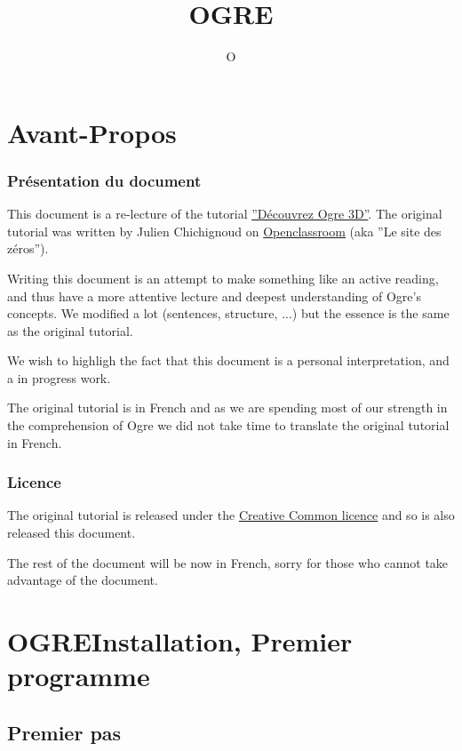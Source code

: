 \documentclass[10pt,a4paper]{report}
\title{OGRE}
\author{O}
\begin{document}
\part*{Avant-Propos}
\section*{Pr\'esentation du document}
This document is a re-lecture of the tutorial \href{http://fr.openclassrooms.com/informatique/cours/decouvrez-ogre-3d}{''D\'ecouvrez Ogre 3D''}. The original tutorial was written by Julien Chichignoud on \href{fr.openclassrooms.com}{Openclassroom} (aka ''Le site des z\'eros'').\newline

Writing this document is an attempt to make something like an active reading, and thus have a more attentive lecture and deepest understanding of Ogre's concepts. We modified a lot (sentences, structure, ...) but the essence is the same as the original tutorial.\newline

We wish to highligh the fact that this document is a personal interpretation, and a in progress work.\newline

The original tutorial is in French and as we are spending most of our strength in the comprehension of Ogre we did not take time to translate the original tutorial in French.\newline


\section*{Licence}
The original tutorial is released under the 
\href{http://creativecommons.org/licenses/by-nc-sa/2.0/}{Creative Common licence} and so is also released this document.\newline

The rest of the document will be now in French, sorry for those who cannot take advantage of the document.





\part{OGRE\newline Installation, Premier programme}

\chapter{Premier pas}
\end{document}

